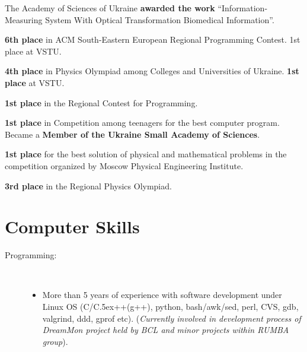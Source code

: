 \documentclass[10pt,overlapped,line]{res}
\def\Cplusplus{{\rm C\raise.5ex\hbox{\small ++}}}
\newcommand{\mplace}[1]{\textbf{#1}}
\newcommand{\wdescription}[1]{({\small \textit{#1}})}
\begin{document}
\begin{resume}
 \begin{position}
   The Academy of Sciences of Ukraine \mplace{awarded the work}
   ``Information-Measuring System With Optical Transformation
   Biomedical Information''.
 \end{position}

 \begin{position}
   \mplace{6th place} in ACM South-Eastern European Regional
   Programming Contest. 1st place at VSTU.
 \end{position}

 \begin{position}
   \mplace{4th place} in Physics Olympiad among Colleges and
   Universities of Ukraine. \mplace{1st place} at VSTU.
 \end{position}

 \begin{position}
 \mplace{1st place} in the Regional Contest for Programming.
 \end{position}

 \begin{position}
   \mplace{1st place} in Competition among teenagers for the best
   computer program. Became a \mplace{Member of the Ukraine Small Academy
     of Sciences}.
 \end{position}

 \begin{position}
   \mplace{1st place} for the best solution of physical and mathematical
   problems in the competition organized by Moscow Physical Engineering Institute.
 \end{position}

 \begin{position}
   \mplace{3rd place} in the Regional Physics Olympiad.

 \end{position}

 \section{Computer Skills}
  \begin{description}
    \item[Programming:] \hspace*{\fill} \\
      \begin{itemize}
      \item More than 5 years of experience with software development
        under Linux OS (C/\Cplusplus(g++), python, bash/awk/sed, perl,
        CVS, gdb, valgrind, ddd, gprof etc).  \wdescription{Currently
          involved in development process of DreamMon project held by
          BCL and minor projects within RUMBA group}.


\end{itemize}
\end{description}
\end{resume}
\end{document}
